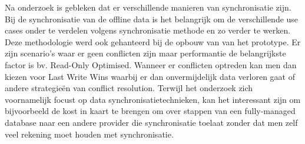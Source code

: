 Na onderzoek is gebleken dat er verschillende manieren van synchronisatie zijn. Bij de synchronisatie van de offline data is het belangrijk om de verschillende use cases onder te verdelen volgens synchronisatie methode en zo verder te werken. Deze methodologie werd ook gehanteerd bij de opbouw van van het prototype. Er zijn scenario's waar er geen conflicten zijn maar performantie de belangrijkste factor is bv. Read-Only Optimised. Wanneer er conflicten optreden kan men dan kiezen voor Last Write Wins waarbij er dan onvermijdelijk data verloren gaat of andere strategie\"en van conflict resolution. Terwijl het onderzoek zich voornamelijk focust op data synchronisatietechnieken, kan het interessant zijn om bijvoorbeeld de kost in kaart te brengen om over stappen van een fully-managed database naar een andere provider die synchronisatie toelaat zonder dat men zelf veel rekening moet houden met synchronisatie.